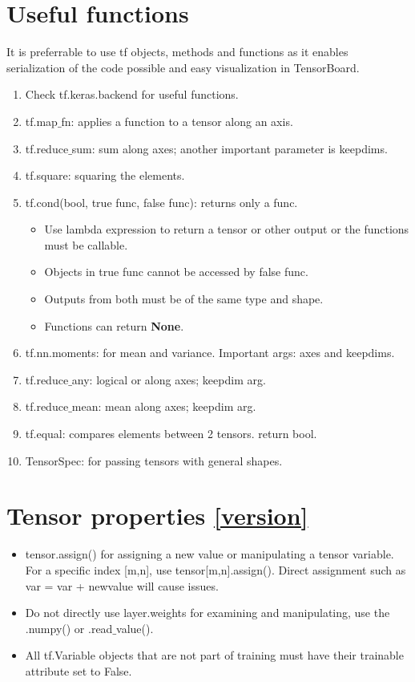 \documentclass[11pt]{article}
\begin{document}
\begin{multicols*}{2}
\section{Useful functions}
It is preferrable to use tf objects, methods and functions as it enables serialization of the code possible and easy visualization in TensorBoard.

\begin{enumerate}
\item Check tf.keras.backend for useful functions.
\item tf.map$\_$fn: applies a function to a tensor along an axis.
\item tf.reduce$\_$sum: sum along axes; another important parameter is keepdims.
\item tf.square: squaring the elements.
\item tf.cond(bool, true func, false func): returns only a func. 
	\begin{itemize}
	\item Use lambda expression to return a tensor or other output or the functions must be callable. 
	\item Objects in true func cannot be accessed by false func.
	\item Outputs from both must be of the same type and shape.
	\item Functions can return \textbf{None}.
	\end{itemize}
\item tf.nn.moments: for mean and variance. Important args: axes and keepdims.
\item tf.reduce$\_$any: logical or along axes; keepdim arg.
\item tf.reduce$\_$mean: mean along axes; keepdim arg.
\item tf.equal: compares elements between 2 tensors. return bool.
\item TensorSpec: for passing tensors with general shapes.
\end{enumerate}

\section{Tensor properties  \autoref{version}}
\begin{itemize}

\item tensor.assign() for assigning a new value or manipulating a tensor variable. For a specific index [m,n], use tensor[m,n].assign(). Direct assignment such as var = var + newvalue will cause issues.
\item Do not directly use layer.weights for examining and manipulating, use the .numpy() or .read$\_$value().
\item All tf.Variable objects that are not part of training must have their trainable attribute set to False.
\end{itemize}


\end{multicols*}
\end{document}
